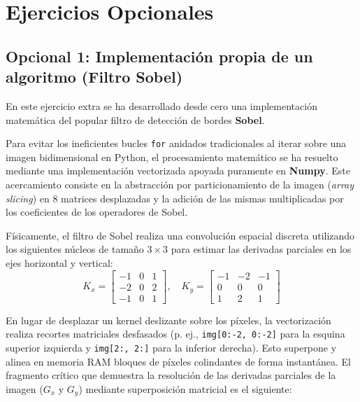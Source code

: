 \documentclass[12pt,a4paper]{article}
\begin{document}
\section{Ejercicios Opcionales}

\subsection{Opcional 1: Implementación propia de un algoritmo (Filtro Sobel)}
En este ejercicio extra se ha desarrollado desde cero una implementación matemática del popular filtro de detección de bordes \textbf{Sobel}. 

Para evitar los ineficientes bucles \texttt{for} anidados tradicionales al iterar sobre una imagen bidimensional en Python, el procesamiento matemático se ha resuelto mediante una implementación vectorizada apoyada puramente en \textbf{Numpy}. Este acercamiento consiste en la abstracción por particionamiento de la imagen (\textit{array slicing}) en 8 matrices desplazadas y la adición de las mismas multiplicadas por los coeficientes de los operadores de Sobel.

Físicamente, el filtro de Sobel realiza una convolución espacial discreta utilizando los siguientes núcleos de tamaño $3 \times 3$ para estimar las derivadas parciales en los ejes horizontal y vertical:
\begin{equation}
    K_x = \begin{bmatrix}
    -1 & 0 & 1 \\
    -2 & 0 & 2 \\
    -1 & 0 & 1
    \end{bmatrix}, \quad
    K_y = \begin{bmatrix}
    -1 & -2 & -1 \\
    0 & 0 & 0 \\
    1 & 2 & 1
    \end{bmatrix}
\end{equation}

En lugar de desplazar un kernel deslizante sobre los píxeles, la vectorización realiza recortes matriciales desfasados (p. ej., \texttt{img[0:-2, 0:-2]} para la esquina superior izquierda y \texttt{img[2:, 2:]} para la inferior derecha). Esto superpone y alinea en memoria RAM bloques de píxeles colindantes de forma instantánea. El fragmento crítico que demuestra la resolución de las derivadas parciales de la imagen ($G_x$ y $G_y$) mediante superposición matricial es el siguiente:
\end{document}
